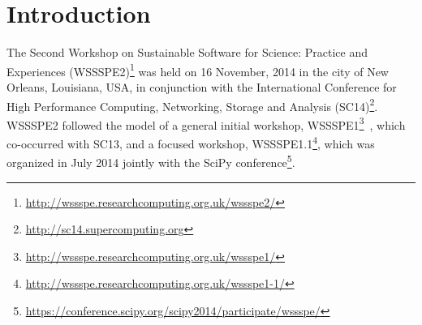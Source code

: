 \documentclass[11pt, oneside]{amsart}
\newcommand{\note}[1]{ {\textcolor{blueish}    { ***Note:      #1 }}}
\newcommand{\katznote}[1]{ {\textcolor{magenta}    { ***Dan:      #1 }}}
\newcommand{\gabnote}[1]{ {\textcolor{cyan}    { ***Gabrielle:     #1 }}}
\newcommand{\nchnote}[1]{  {\textcolor{orange}      { ***Neil: #1 }}}
\newcommand{\manishnote}[1]{  {\textcolor{violet}     { ***Manish: #1 }}}
\newcommand{\davidnote}[1]{  {\textcolor{darkgreen}      { ***David: #1 }}}
\begin{document}
\section{Introduction} \label{sec:intro}

%
%
%
%


The Second Workshop on Sustainable Software for Science: Practice and
Experiences
(WSSSPE2)\footnote{\url{http://wssspe.researchcomputing.org.uk/wssspe2/}} was
held on 16 November, 2014 in the city of New Orleans, Louisiana, USA, in
conjunction with the International Conference for High Performance Computing,
Networking, Storage and Analysis
(SC14)\footnote{\url{http://sc14.supercomputing.org}}. WSSSPE2 followed the
model of a general initial workshop,
WSSSPE1\footnote{\url{http://wssspe.researchcomputing.org.uk/wssspe1/}}~\cite{WSSSPE1-pre-report,WSSSPE1},
which co-occurred with SC13, and a focused workshop,
WSSSPE1.1\footnote{\url{http://wssspe.researchcomputing.org.uk/wssspe1-1/}},
which was organized in July 2014 jointly with the SciPy
conference\footnote{\url{https://conference.scipy.org/scipy2014/participate/wssspe/}}.
\end{document}
